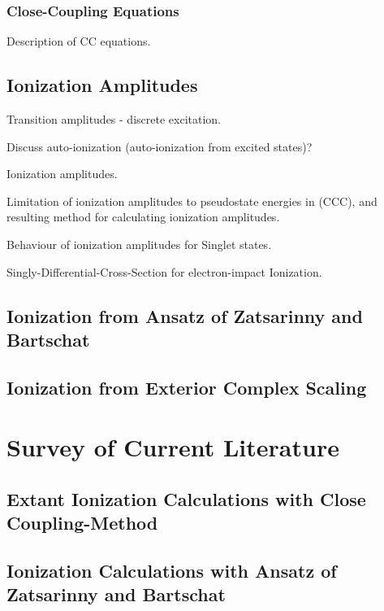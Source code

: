 \documentclass[draft]{article}
\begin{document}
\subsubsection{Close-Coupling Equations}
\label{sec:cc-equations}

Description of CC equations.

\subsection{Ionization Amplitudes}
\label{sec:ionization-amplitudes}

Transition amplitudes - discrete excitation.

Discuss auto-ionization (auto-ionization from excited states)?

Ionization amplitudes.

Limitation of ionization amplitudes to pseudostate energies in (CCC), and
resulting method for calculating ionization amplitudes.

Behaviour of ionization amplitudes for Singlet states.

Singly-Differential-Cross-Section for electron-impact Ionization.

\subsection{Ionization from Ansatz of Zatsarinny and Bartschat}
\label{sec:ansatz-zatsarinny-bartschat}

\subsection{Ionization from Exterior Complex Scaling}
\label{sec:ionization-ecs}

\section{Survey of Current Literature}
\label{sec:survey-literature}

\subsection{Extant Ionization Calculations with Close Coupling-Method}

\subsection{Ionization Calculations with Ansatz of Zatsarinny and Bartschat}
\end{document}

